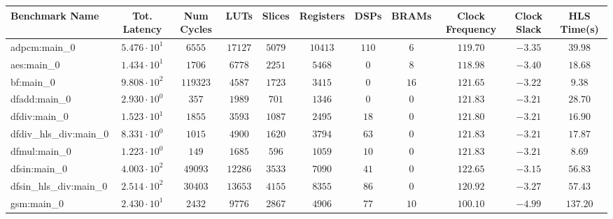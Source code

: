 \begin{tabular}{|l|c|c|c|c|c|c|c|c|c|c|}
\hline
Benchmark Name          & Tot. Latency           & Num Cycles & LUTs       & Slices    & Registers & DSPs    & BRAMs   & Clock Frequency & Clock Slack & HLS Time(s) \\
\hline
adpcm:main\_0           & $ 5.476 \cdot 10^{1} $ & $ 6555   $ & $ 17127  $ & $ 5079  $ & $ 10413 $ & $ 110 $ & $ 6   $ & $ 119.70      $ & $ -3.35   $ & $ 39.98   $ \\
aes:main\_0             & $ 1.434 \cdot 10^{1} $ & $ 1706   $ & $ 6778   $ & $ 2251  $ & $ 5468  $ & $ 0   $ & $ 8   $ & $ 118.98      $ & $ -3.40   $ & $ 18.68   $ \\
bf:main\_0              & $ 9.808 \cdot 10^{2} $ & $ 119323 $ & $ 4587   $ & $ 1723  $ & $ 3415  $ & $ 0   $ & $ 16  $ & $ 121.65      $ & $ -3.22   $ & $ 9.38    $ \\
dfadd:main\_0           & $ 2.930 \cdot 10^{0} $ & $ 357    $ & $ 1989   $ & $ 701   $ & $ 1346  $ & $ 0   $ & $ 0   $ & $ 121.83      $ & $ -3.21   $ & $ 28.70   $ \\
dfdiv:main\_0           & $ 1.523 \cdot 10^{1} $ & $ 1855   $ & $ 3593   $ & $ 1087  $ & $ 2495  $ & $ 18  $ & $ 0   $ & $ 121.80      $ & $ -3.21   $ & $ 16.90   $ \\
dfdiv\_hls\_div:main\_0 & $ 8.331 \cdot 10^{0} $ & $ 1015   $ & $ 4900   $ & $ 1620  $ & $ 3794  $ & $ 63  $ & $ 0   $ & $ 121.83      $ & $ -3.21   $ & $ 17.87   $ \\
dfmul:main\_0           & $ 1.223 \cdot 10^{0} $ & $ 149    $ & $ 1685   $ & $ 596   $ & $ 1059  $ & $ 10  $ & $ 0   $ & $ 121.83      $ & $ -3.21   $ & $ 8.69    $ \\
dfsin:main\_0           & $ 4.003 \cdot 10^{2} $ & $ 49093  $ & $ 12286  $ & $ 3533  $ & $ 7090  $ & $ 41  $ & $ 0   $ & $ 122.65      $ & $ -3.15   $ & $ 56.83   $ \\
dfsin\_hls\_div:main\_0 & $ 2.514 \cdot 10^{2} $ & $ 30403  $ & $ 13653  $ & $ 4155  $ & $ 8355  $ & $ 86  $ & $ 0   $ & $ 120.92      $ & $ -3.27   $ & $ 57.43   $ \\
gsm:main\_0             & $ 2.430 \cdot 10^{1} $ & $ 2432   $ & $ 9776   $ & $ 2867  $ & $ 4906  $ & $ 77  $ & $ 10  $ & $ 100.10      $ & $ -4.99   $ & $ 137.20  $ \\

\end{tabular}
